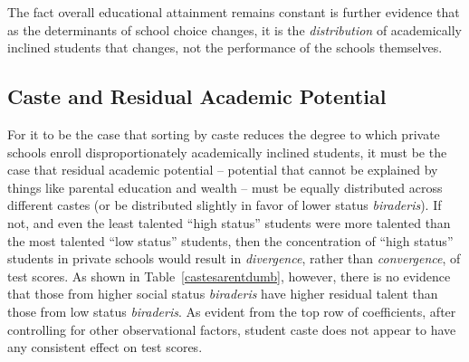 \documentclass[Eubank_pk_ethnic_sorting.tex]{subfiles}
\begin{document}


The fact overall educational attainment remains constant is further evidence that as the determinants of school choice changes, it is the \emph{distribution} of academically inclined students that changes, not the performance of the schools themselves. 

\subsection{Caste and Residual Academic Potential}\label{residual_potential}

For it to be the case that sorting by caste reduces the degree to which private schools enroll disproportionately academically inclined students, it must be the case that residual academic potential -- potential that cannot be explained by things like parental education and wealth -- must be equally distributed across different castes (or be distributed slightly in favor of lower status \emph{biraderis}). If not, and even the least talented ``high status'' students were more talented than the most talented ``low status'' students, then the concentration of ``high status'' students in private schools would result in \emph{divergence}, rather than \emph{convergence}, of test scores. As shown in Table~\ref{castesarentdumb}, however, there is no evidence that those from higher social status \emph{biraderis} have higher residual talent than those from low status \emph{biraderis}. As evident from the top row of coefficients, after controlling for other observational factors, student caste does not appear to have any consistent effect on test scores. 


\end{document}

